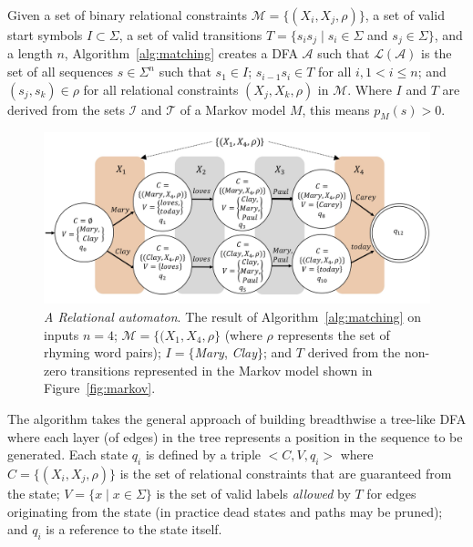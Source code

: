 \documentclass[phd,electronic,oneside,twosidetoc,letterpaper,chaptercenter,parttop,lol,lof,lot]{byumsphd}
\begin{document}
Given a set of binary relational constraints $\mathcal{M} = \{(X_i,X_j,\rho)\}$, a set of valid start symbols $I\subset\Sigma$, a set of valid transitions $T=\{s_is_j\mid s_i\in\Sigma$ and $s_j\in\Sigma\}$, and a length $n$, Algorithm~\ref{alg:matching} creates a DFA $\mathcal{A}$ such that $\mathcal{L}(\mathcal{A})$ is the set of all sequences  $s\in\Sigma^n$ such that $s_1\in I$; $s_{i-1}s_i\in T$ for all $i, 1 < i \leq n$; and $(s_j,s_k)\in\rho$ for all relational constraints $(X_j,X_k,\rho)$ in $\mathcal{M}$. Where $I$ and $T$ are derived from the sets $\mathcal{I}$ and $\mathcal{T}$ of a Markov model $M$, this means $p_M(s) > 0$.

\begin{figure}
    \centering
    \includegraphics[width=.8\textwidth]{DFA}
    \caption{\textit{A {\sc Relational} automaton}. The result of Algorithm~\ref{alg:matching} on inputs $n=4$; $\mathcal{M}=\{(X_1,X_4,\rho\}$ (where $\rho$ represents the set of rhyming word pairs); $I=\{$\textit{Mary}, \textit{Clay}$\}$; and $T$ derived from the non-zero transitions represented in the Markov model shown in Figure~\ref{fig:markov}.}
    \label{fig:DFA}
\end{figure}

The algorithm takes the general approach of building breadthwise a tree-like DFA where each layer (of edges) in the tree represents a position in the sequence to be generated. Each state $q_i$ is defined by a triple $<C,V,q_i>$ where $C = \{(X_i,X_j,\rho)\}$ is the set of relational constraints that are guaranteed from the state; $V=\{x\mid x\in\Sigma\}$ is the set of valid labels \emph{allowed} by $T$ for edges originating from the state (in practice dead states and paths may be pruned); and $q_i$ is a reference to the state itself.
\end{document}
